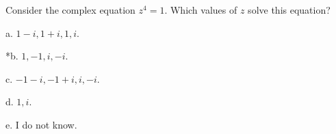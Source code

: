 
Consider the complex equation $z^{4}=1$. Which values of $z$ solve this equation?

a. \(1-i, 1+i, 1, i\).

*b. \(1, -1, i, -i\).

c. \(-1-i,-1+i, i, -i\).

d. \(1, i\).

e. I do not know.\\

